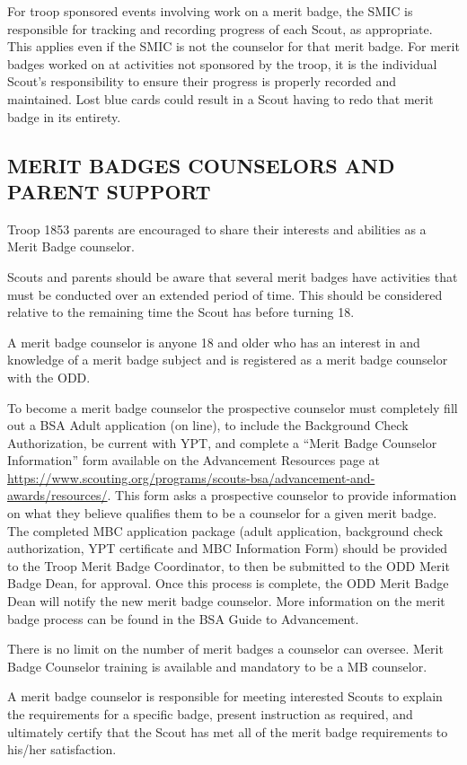 \documentclass{ltxguide}
\begin{document}
For troop sponsored events involving work on a merit badge, the SMIC is responsible for tracking and recording progress of each Scout, as appropriate. This applies even if the SMIC is not the counselor for that merit badge. For merit badges worked on at activities not sponsored by the troop, it is the individual Scout's responsibility to ensure their progress is properly recorded and maintained. Lost blue cards could result in a Scout having to redo that merit badge in its entirety.

\subsection{MERIT BADGES COUNSELORS AND PARENT SUPPORT}
Troop 1853 parents are encouraged to share their interests and abilities as a Merit Badge counselor.

Scouts and parents should be aware that several merit badges have activities that must be conducted over an extended period of time. This should be considered relative to the remaining time the Scout has before turning 18.

A merit badge counselor is anyone 18 and older who has an interest in and knowledge of a merit badge subject and is registered as a merit badge counselor with the \ac{ODD}.

To become a merit badge counselor the prospective counselor must completely fill out a \ac{BSA} Adult application (on line), to include the Background Check Authorization, be current with \ac{YPT}, and complete a “Merit Badge Counselor Information” form available on the Advancement Resources page at \url{https://www.scouting.org/programs/scouts-bsa/advancement-and-awards/resources/}. This form asks a prospective counselor to provide information on what they believe qualifies them to be a counselor for a given merit badge. The completed MBC application package (adult application, background check authorization, YPT certificate and MBC Information Form) should be provided to the Troop Merit Badge Coordinator, to then be submitted to the ODD Merit Badge Dean, for approval. Once this process is complete, the ODD Merit Badge Dean will notify the new merit badge counselor. More information on the merit badge process can be found in the \ac{BSA} Guide to Advancement.

There is no limit on the number of merit badges a counselor can oversee. Merit Badge Counselor training is available and mandatory to be a MB counselor.

A merit badge counselor is responsible for meeting interested Scouts to explain the requirements for a specific badge, present instruction as required, and ultimately certify that the Scout has met all of the merit badge requirements to his/her satisfaction.
\end{document}
